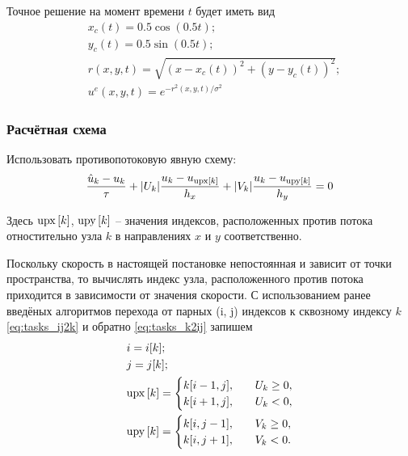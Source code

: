 Точное решение на момент времени $t$ будет иметь вид
\begin{align*}
  	& x_c(t) =  0.5\cos(0.5 t); \\
    & y_c(t) =  0.5\sin(0.5 t); \\
    & r(x, y, t) = \sqrt{(x - x_c(t))^2 + (y - y_c(t))^2};  \\
    & u^e(x, y, t) = e^{-r^2(x, y, t)/\sigma^2}
\end{align*}


\subsubsection{Расчётная схема}

Использовать противопотоковую явную схему:
\begin{equation*}
    \frac{\hat u_k - u_k}{\tau}
        + |U_k| \frac{u_k - u_{{\mathrm{upx}\left[k\right]}}}{h_x}
        + |V_k| \frac{u_k - u_{{\mathrm{upy}\left[k\right]}}}{h_y} = 0
\end{equation*}

Здесь ${\mathrm{upx}\left[k\right]}$, ${\mathrm{upy}\left[k\right]}$ -- 
значения индексов, расположенных против потока
отностительно узла $k$ в направлениях $x$ и $y$ соответственно.

Поскольку скорость в настоящей постановке непостоянная и зависит от точки пространства,
то вычислять индекс узла, расположенного против потока
приходится в зависимости от значения скорости.
С использованием ранее введёных алгоритмов перехода
от парных (i, j) индексов к сквозному индексу $k$ \eqref{eq:tasks_ij2k} и обратно \eqref{eq:tasks_k2ij} запишем
\begin{align*}
    & i = i[k]; \\
    & j = j[k]; \\
    & {\mathrm{upx}\left[k\right]} = \begin{cases}
          k[i-1, j], & \quad U_k \geq 0, \\
          k[i+1, j], & \quad U_k < 0 ,\\
      \end{cases} \\
    & {\mathrm{upy}\left[k\right]} = \begin{cases}
          k[i, j-1], & \quad V_k \geq 0, \\
          k[i, j+1], & \quad V_k < 0.\\
      \end{cases}
\end{align*}

